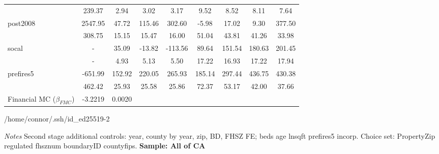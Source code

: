 \begin{table}
{\begin{tabular}{lcccccccc}
 & 239.37 & 2.94 & 3.02 & 3.17 & 9.52 & 8.52 & 8.11 & 7.64 \\                                           
post2008 & 2547.95 & 47.72 & 115.46 & 302.60 & -5.98 & 17.02 & 9.30 & 377.50 \\                         
 & 308.75 & 15.15 & 15.47 & 16.00 & 51.04 & 43.81 & 41.26 & 33.98 \\                                    
socal & - & 35.09 & -13.82 & -113.56 & 89.64 & 151.54 & 180.63 & 201.45 \\                              
 & - & 4.93 & 5.13 & 5.50 & 17.22 & 16.93 & 17.22 & 17.94 \\                                            
prefires5 & -651.99 & 152.92 & 220.05 & 265.93 & 185.14 & 297.44 & 436.75 & 430.38 \\                   
 & 462.42 & 25.93 & 25.58 & 25.86 & 72.37 & 53.17 & 42.00 & 37.66 \\                                    
Financial MC ($\beta_{FMC}$) & -3.2219 & 0.0020 \\\hline
\end{tabular} 
}/home/connor/.ssh/id_ed25519-2
\scriptsize
\parbox{\textwidth}{\emph{Notes} Second stage additional controls: year, county by year, zip, BD, FHSZ FE; beds age lnsqft prefires5 incorp. Choice set: PropertyZip regulated fhsznum boundaryID  countyfips. \bf{Sample: All of CA}}
\end{table}